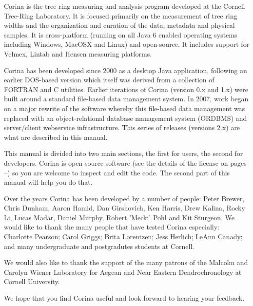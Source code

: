Corina is the tree ring measuring and analysis program developed at the Cornell Tree-Ring Laboratory. It is focused primarily on the measurement of tree ring widths and the organization and curation of the data, metadata and physical samples. It is cross-platform (running on all Java 6 enabled operating systems including Windows, MacOSX and Linux) and open-source. It includes support for Velmex, Lintab and Hensen measuring platforms.

Corina has been developed since 2000 as a desktop Java application, following an earlier DOS-based version which itself was derived from a collection of FORTRAN and C utilities. Earlier iterations of Corina (version 0.x and 1.x) were built around a standard file-based data management system. In 2007, work began on a major rewrite of the software whereby this file-based data management was replaced with an object-relational database management system (ORDBMS) and server/client webservice infrastructure. This series of releases (versions 2.x) are what are described in this manual.

This manual is divided into two main sections, the first for users, the second for developers.  Corina is open source software (see the details of the license on pages \pageref{txt:licenseStart}--\pageref{txt:licenseEnd}) so you are welcome to inspect and edit the code.  The second part of this manual will help you do that.

Over the years Corina has been developed by a number of people: Peter Brewer, Chris Dunham, Aaron Hamid, Dan Girshovich, Ken Harris, Drew Kalina, Rocky Li, Lucas Madar, Daniel Murphy, Robert 'Mecki' Pohl and Kit Sturgeon.  We would like to thank the many people that have tested Corina especially: Charlotte Pearson; Carol Griggs; Brita Lorentzen; Jess Herlich; LeAnn Canady; and many undergraduate and postgradutes students at Cornell.  

We would also like to thank the support of the many patrons of the Malcolm and Carolyn Wiener Laboratory for Aegean and Near Eastern Dendrochronology at Cornell University.  

We hope that you find Corina useful and look forward to hearing your feedback.



